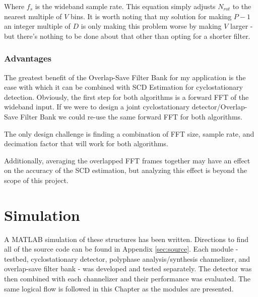 \documentclass[12pt]{report}
\begin{document}
Where $f_s$ is the wideband sample rate. This equation simply adjusts $N_{rot}$ to
the nearest multiple of $V$ bins. It is worth noting that my solution for
making $P-1$ an integer multiple of $D$ is only making this problem worse by
making $V$ larger - but there's nothing to be done about that other than opting
for a shorter filter.

\subsection{Advantages}
\label{sec:os_advantages}

The greatest benefit of the Overlap-Save Filter Bank for my application is
the ease with which it can be combined with SCD Estimation for cyclostationary
detection. Obviously, the first step for both algorithms is a forward FFT of the
wideband input. If we were to design a joint cyclostationary
detector/Overlap-Save Filter Bank we could re-use the same forward FFT for both
algorithms.

The only design challenge is finding a combination of FFT size, sample rate,
and decimation factor that will work for both algorithms.



Additionally, averaging the overlapped FFT frames together may have an effect
on the accuracy of the SCD estimation, but analyzing this effect is beyond the
scope of this project.

\chapter{Simulation}
\label{sec:sim}
A MATLAB simulation of these structures has been written. Directions to find
all of the source code can be found in Appendix \ref{sec:source}. Each module
- testbed, cyclostationary detector, polyphase analysis/synthesis channelizer,
and overlap-save filter bank - was developed and tested separately. The
detector was then combined with each channelizer and their performance was
evaluated.  The same logical flow is followed in this Chapter as the modules
are presented.
\end{document}
